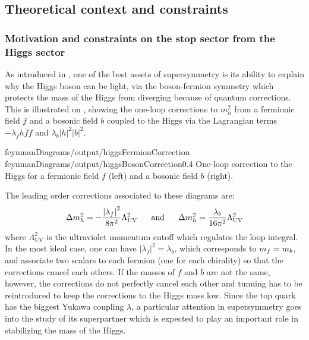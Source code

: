     \subsection{Theoretical context and constraints}

    \subsubsection{Motivation and constraints on the stop sector from the Higgs sector}

    As introduced in , one of the best assets of supersymmetry is its ability to explain why the Higgs
    boson can be light, via the boson-fermion symmetry which protects the mass
    of the Higgs from diverging because of quantum corrections. This is illustrated on
    , showing the one-loop corrections to $m_h^2$
    from a fermionic field $f$ and a bosonic field $b$ coupled to the Higgs via the
    Lagrangian terms $- \lambda_f h \bar{f} f$ and $\lambda_b \left| h \right|^2 \left| b \right|^2$.

    {feynmanDiagrams/output/higgsFermionCorrection}
    {feynmanDiagrams/output/higgsBosonCorrection}{0.4}
    {One-loop correction to the Higgs for a fermionic field $f$ (left) and a bosonic field $b$ (right).}

    The leading order corrections associated to these diagrams are:
    \begin{equation}
        \Delta m_{h}^2 = - \frac{\left| \lambda_f \right|^2}{8\pi^2} \Lambda^2_{\text{UV}}
        \, \, \, \, \, \, \, \, \, \, \text{and} \, \, \, \, \, \, \, \, \, \,
        \Delta m_{h}^2 =   \frac{\lambda_b}{16\pi^2} \Lambda^2_{\text{UV}}
    \end{equation}
    where $\Lambda^2_{\text{UV}}$ is the ultraviolet momentum cutoff which regulates
    the loop integral. In the most ideal case, one can have $\left| \lambda_f \right|^2
    = \lambda_b$, which corresponds to $m_{f} = m_{b}$, and associate two scalars
    to each fermion (one for each chirality) so that the corrections cancel each others.
    If the masses of $f$ and $b$ are not the same, however, the corrections do not
    perfectly cancel each other and tunning has to be reintroduced to keep the
    corrections to the Higgs mass low. Since the top quark has the biggest Yukawa coupling $\lambda$, a
    particular attention in supersymmetry goes into the study of its superpartner
    which is expected to play an important role in stabilizing the mass of the Higgs.

